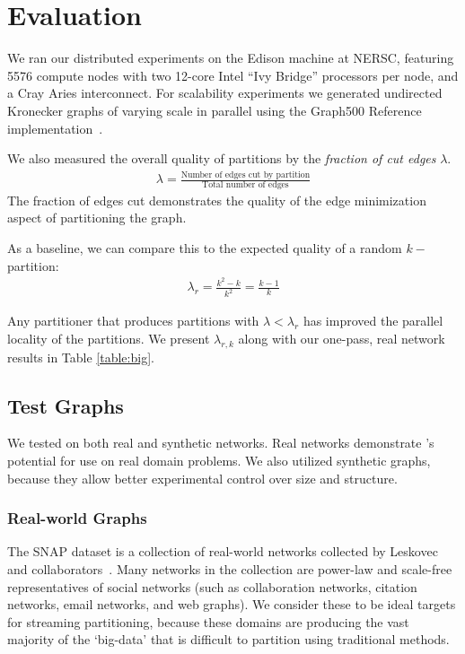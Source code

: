 \section{Evaluation}

We ran our distributed experiments on the Edison machine at NERSC, featuring 5576 compute nodes with two 12-core Intel ``Ivy Bridge'' processors per node, and a Cray Aries interconnect. For scalability experiments we generated undirected Kronecker graphs of varying scale in parallel using the Graph500 Reference implementation~\cite{graph500}. 

We also measured the overall quality of partitions by the \textit{fraction of cut edges} $\lambda$.
\begin{align}\lambda = \frac{\text{Number of edges cut by partition}}{\text{Total number of edges}}\end{align}
The fraction of edges cut demonstrates the quality of the edge minimization aspect of partitioning the graph.

As a baseline, we can compare this to the expected quality of a random $k-$partition:
\begin{align}\lambda_r = \frac{k^2 - k}{k^2} = \frac{k-1}{k} \end{align}

Any partitioner that produces partitions with $\lambda < \lambda_r$ has improved the parallel locality of the partitions. 
We present $\lambda_{r,k}$ along with our one-pass, real network results in Table \ref{table:big}.

\subsection{Test Graphs}
We tested \ourmethod on both real and synthetic networks.
Real networks demonstrate \ourmethod's potential for use on real domain problems.
We also utilized synthetic graphs, because they allow better experimental control over size and structure.
\subsubsection{Real-world Graphs}
The SNAP dataset is a collection of real-world networks collected by Leskovec and collaborators~\cite{Leskovec-data, snapnets}. 
Many networks in the collection are power-law and scale-free representatives of social networks (such as collaboration networks, citation networks, email networks, and web graphs). We consider these to be ideal targets for streaming partitioning, because these domains are producing the vast majority of the `big-data' that is difficult to partition using traditional methods.


